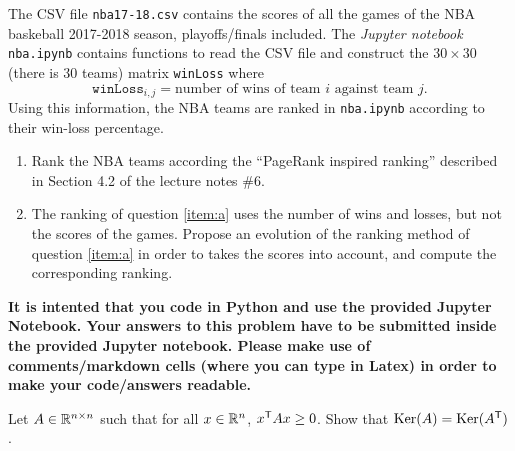 \documentclass[11pt,nocut]{article}
\begin{document}
\begin{problem}[5 points]
	The CSV file \texttt{nba17-18.csv} contains the scores of all the games of the NBA baskeball 2017-2018 season, playoffs/finals included. 
	The \emph{Jupyter notebook} \texttt{nba.ipynb} contains functions to read the CSV file and construct the $30 \times 30$ (there is $30$ teams) matrix \texttt{winLoss} where
	$$
	\texttt{winLoss}_{i,j} = \text{number of wins of team $i$ against team $j$.}
	$$
	Using this information, the NBA teams are ranked in \texttt{nba.ipynb} according to their win-loss percentage.
	\begin{enumerate}[label=\normalfont(\textbf{\alph*})]
		\item \label{item:a} Rank the NBA teams according the ``PageRank inspired ranking'' described in Section 4.2 of the lecture notes \#6.
		\item The ranking of question \ref{item:a} uses the number of wins and losses, but not the scores of the games. Propose an evolution of the ranking method of question \ref{item:a} in order to takes the scores into account, and compute the corresponding ranking.
	\end{enumerate}

	\textbf{It is intented that you code in Python and use the provided Jupyter Notebook. Your answers to this problem have to be submitted inside the provided Jupyter notebook. Please make use of comments/markdown cells (where you can type in Latex) in order to make your code/answers readable.}
\end{problem}


\vspace{1mm}




\begin{problem}[$\star$]
	Let $A \in \mathbb{R}^{n \times n}$ such that for all $x \in \mathbb{R}^n$, $x^{{\sf T}} A x \geq 0$. Show that ${{\rm Ker}}(A) = {{\rm Ker}}(A^{{\sf T}})$.
\end{problem}
\vspace{1cm}
\centerline{}

%
%
\end{document}
